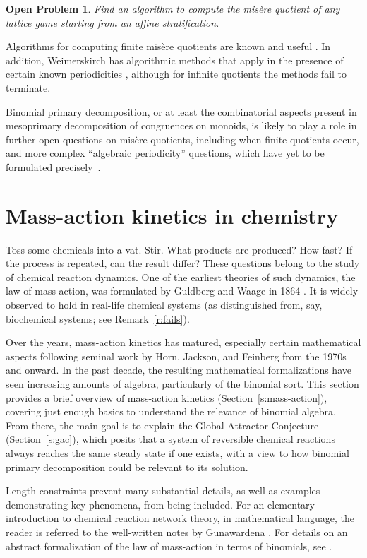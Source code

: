 \documentclass[12pt]{amsart}
\numberwithin{equation}{section}
\newtheorem{prob}[thm]{Open Problem}
\theoremstyle{definition}
\begin{document}
\begin{prob}
Find an algorithm to compute the mis\`ere quotient of any lattice game
starting from an affine stratification.
\end{prob}

Algorithms for computing finite mis\`ere quotients are known and
useful \cite[Appendix~A]{misereQuots}.  In addition, Weimerskirch has
algorithmic methods that apply in the presence of certain known
periodicities \cite{weimerskirch}, although for infinite quotients the
methods fail to terminate.

Binomial primary decomposition, or at least the combinatorial aspects
present in mesoprimary decomposition of congruences on monoids, is
likely to play a role in further open questions on mis\`ere quotients,
including when finite quotients occur, and more complex ``algebraic
periodicity'' questions, which have yet to be formulated
precisely~\cite[Appendix~A.5]{misereQuots}.

\section{Mass-action kinetics in chemistry}\label{s:chem}
Toss some chemicals into a vat.  Stir.  What products are produced?
How fast?  If the process is repeated, can the result differ?  These
questions belong to the study of chemical reaction dynamics.  One of
the earliest theories of such dynamics, the law of mass action, was
formulated by Guldberg and Waage in 1864 \cite{GW1864}.  It is widely
observed to hold in real-life chemical systems (as distinguished from,
say, biochemical systems; see Remark~\ref{r:fails}).

Over the years, mass-action kinetics has matured, especially certain
mathematical aspects following seminal work by Horn, Jackson, and
Feinberg \cite{HJ72,feinberg87} from the 1970s and onward.  In the
past decade, the resulting mathematical formalizations have seen
increasing amounts of algebra, particularly of the binomial sort.
This section provides a brief overview of mass-action kinetics
(Section~\ref{s:mass-action}), covering just enough basics to
understand the relevance of binomial algebra.  {}From there, the main
goal is to explain the Global Attractor Conjecture
(Section~\ref{s:gac}), which posits that a system of reversible
chemical reactions always reaches the same steady state if one exists,
with a view to how binomial primary decomposition could be relevant to
its solution.

Length constraints prevent many substantial details, as well as
examples demonstrating key phenomena, from being included.  For an
elementary introduction to chemical reaction network theory, in
mathematical language, the reader is referred to the well-written
notes by Gunawardena \cite{gun03}.  For details on an abstract
formalization of the law of mass-action in terms of binomials, see
\cite{mass-actionReview}.
\end{document}
